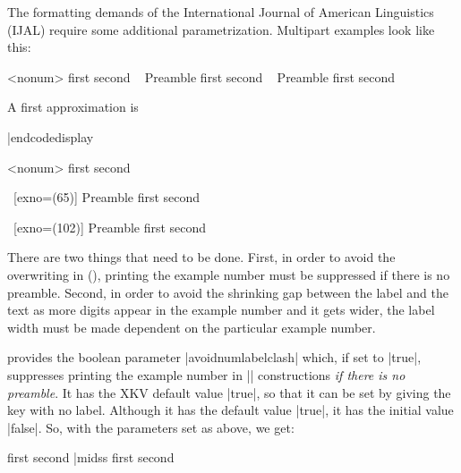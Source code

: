 \noindent The formatting demands of the International Journal of
American Linguistics (IJAL) require some additional
parametrization.  Multipart examples look like this:

%
\begingroup
{}
\pex<nonum>
\a first
\a second
\xe
{}
\pex~
Preamble
\a first
\a second
\xe
{}
\pex~
Preamble
\a first
\a second
\xe
\endgroup

A first approximation is

\codedisplay
{}
|endcodedisplay

\begingroup



\pex[exno=(5)]<nonum>
\a first
\a second
\xe

\pex~[exno=(65)]
Preamble
\a first
\a second
\xe

\pex~[exno=(102)]
Preamble
\a first
\a second
\xe

There are two things that need to be done.  First, in order to
avoid the overwriting in (), printing the example
number must be suppressed if there is no preamble. Second, in
order to avoid the shrinking gap between the label and the text
as more digits appear in the example number and it gets wider,
the label width must be made dependent on the particular example
number.

\expex\/ provides the boolean parameter |avoidnumlabelclash|
which, if set to |true|, suppresses printing the example number
in |\pex| constructions {\it if there is no preamble}.  It has
the XKV default value |true|, so that it can be set by giving the
key with no label.  Although it has the default value |true|, it
has the initial value |false|.  So, with the parameters set as
above, we get:

\beginss
\pex[exno=(5),avoidnumlabelclash]
\a first
\a second
\xe|midss
\pex[exno=(5),avoidnumlabelclash]
\a first
\a second
\xe
\endss

